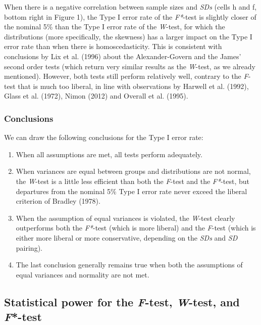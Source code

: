 \documentclass[man,floatsintext]{apa6}
\providecommand{\tightlist}{%
  \setlength{\itemsep}{0pt}\setlength{\parskip}{0pt}}
\begin{document}
When there is a negative correlation between sample sizes and \emph{SDs} (cells h and f, bottom right in Figure 1), the Type I error rate of the \emph{F*}-test is slightly closer of the nominal 5\% than the Type I error rate of the \emph{W}-test, for which the distributions (more specifically, the skewness) has a larger impact on the Type I error rate than when there is homoscedasticity. This is consistent with conclusions by Lix et al. (1996) about the Alexander-Govern and the James' second order tests (which return very similar results as the \emph{W}-test, as we already mentioned). However, both tests still perform relatively well, contrary to the \emph{F}-test that is much too liberal, in line with observations by Harwell et al. (1992), Glass et al. (1972), Nimon (2012) and Overall et al. (1995).

\hypertarget{conclusions}{%
\subsubsection{Conclusions}\label{conclusions}}

We can draw the following conclusions for the Type I error rate:

\begin{enumerate}
\def\labelenumi{\arabic{enumi})}
\tightlist
\item
  When all assumptions are met, all tests perform adequately.\\
\item
  When variances are equal between groups and distributions are not normal, the \emph{W}-test is a little less efficient than both the \emph{F}-test and the \emph{F*}-test, but departures from the nominal 5\% Type I error rate never exceed the liberal criterion of Bradley (1978).\\
\item
  When the assumption of equal variances is violated, the \emph{W}-test clearly outperforms both the \emph{F*}-test (which is more liberal) and the \emph{F}-test (which is either more liberal or more conservative, depending on the \emph{SDs} and \emph{SD} pairing).\\
\item
  The last conclusion generally remains true when both the assumptions of equal variances and normality are not met.
\end{enumerate}

\hypertarget{statistical-power-for-the-f-test-w-test-and-f-test}{%
\subsection{\texorpdfstring{Statistical power for the \emph{F}-test, \emph{W}-test, and \emph{F}*-test}{Statistical power for the F-test, W-test, and F*-test}}\label{statistical-power-for-the-f-test-w-test-and-f-test}}
\end{document}
